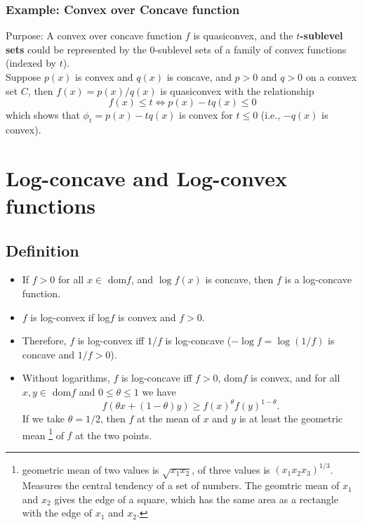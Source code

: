 \subsubsection{Example: Convex over Concave function}
Purpose: A convex over concave function $f$ is quasiconvex, and the {\bf $t$-sublevel sets} could be represented by the $0$-sublevel sets of a family of convex functions (indexed by $t$).\\
Suppose $p(x)$ is convex and $q(x)$ is concave, and $p>0$ and $q>0$ on a convex set $C$, then 
$f(x)=p(x)/q(x)$ is quasiconvex with the relationship
\begin{equation}
   f(x) \le t \Leftrightarrow p(x)-tq(x) \le 0
\end{equation}
which shows that $\phi_t=p(x)-tq(x)$ is convex for $t\le 0$ (i.e., $-q(x)$ is convex).

\section{Log-concave and Log-convex functions}
\subsection{Definition} 
\begin{itemize}
   \item If $f>0$ for all $x \in$ dom$f$, and $\log f(x)$ is concave, then $f$ is a log-concave function.
   \item $f$ is log-convex if log$f$ is convex and $f>0$.
   \item Therefore, $f$ is log-convex iff $1/f$ is log-concave ($-\log f= \log(1/f)$ is concave and $1/f>0$).
   \item Without logarithms, $f$ is log-concave iff $f>0$, dom$f$ is convex, and for all $x, y \in$ dom$f$ and $0\le \theta \le 1$ we have
         \begin{equation}
            f(\theta x+ (1-\theta)y) \ge f(x)^\theta f(y)^{1-\theta}.
         \end{equation}
         If we take $\theta=1/2$, then $f$ at the mean of $x$ and $y$ is at least the geometric mean 
         \footnote{geometric mean of two values is $\sqrt{x_1x_2}$, of three values is $(x_1x_2x_3)^{1/3}$. Measures the central tendency of a set of numbers. 
         The geomtric mean of $x_1$ and $x_2$ gives the edge of a square, which has the same area as a rectangle with the edge of $x_1$ and $x_2$.  } 
         of $f$ at the two points.
\end{itemize}


